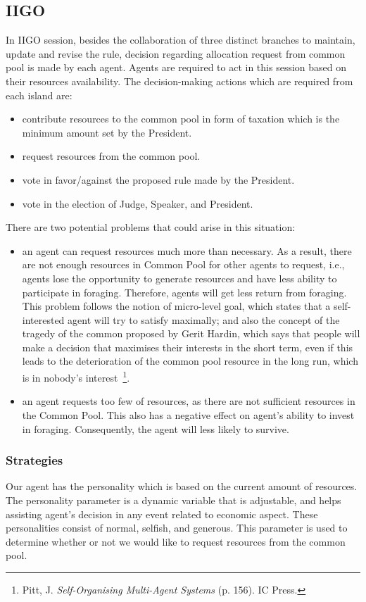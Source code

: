\subsection{IIGO} \label{subsec:Team6_IIGO}
In IIGO session, besides the collaboration of three distinct branches to maintain, update and revise the rule, decision regarding allocation request from common pool is made by each agent. Agents are required to act in this session based on their resources availability. The decision-making actions which are required from each island are:
\begin{itemize}
    \item contribute resources to the common pool in form of taxation which is the minimum amount set by the President.
    \item request resources from the common pool.
    \item vote in favor/against the proposed rule made by the President.
    \item vote in the election of Judge, Speaker, and President.
\end{itemize}
There are two potential problems that could arise in this situation:
\begin{itemize}
\item an agent can request resources much more than necessary. As a result, there are not enough resources in Common Pool for other agents to request, i.e., agents lose the opportunity to generate resources and have less ability to participate in foraging. Therefore, agents will get less return from foraging. This problem follows the notion of micro-level goal, which states that a self-interested agent will try to satisfy maximally; and also the concept of the tragedy of the common proposed by Gerit Hardin, which says that people will make a decision that maximises their interests in the short term, even if this leads to the deterioration of the common pool resource in the long run, which is in nobody's interest~\footnote{Pitt, J. \textit{Self-Organising Multi-Agent Systems} (p. 156). IC Press.}.
    \item an agent requests too few of resources, as there are not sufficient resources in the Common Pool. This also has a negative effect on agent’s ability to invest in foraging. Consequently, the agent will less likely to survive. 
\end{itemize}

\subsubsection{Strategies} \label{subsubsec:Team6_IIGO:Strategies}
Our agent has the personality which is based on the current amount of resources. The personality parameter is a dynamic variable that is adjustable, and helps assisting agent’s decision in any event related to economic aspect. These personalities consist of normal, selfish, and generous. This parameter is used to determine whether or not we would like to request resources from the common pool. 

